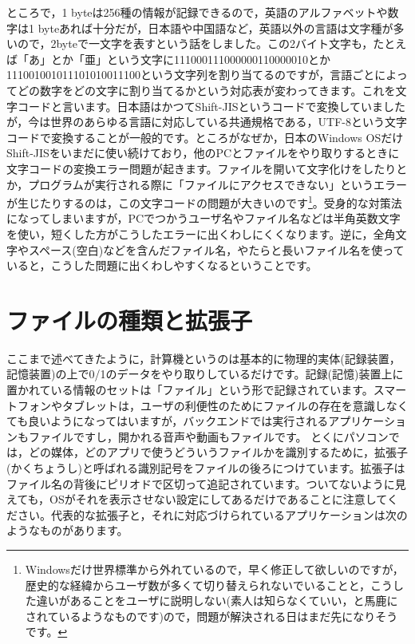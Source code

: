 \documentclass{ltjsbook}
\begin{document}
ところで，1 byteは256種の情報が記録できるので，英語のアルファベットや数字は1 byteあれば十分だが，日本語や中国語など，英語以外の言語は文字種が多いので，2byteで一文字を表すという話をしました。この2バイト文字も，たとえば「あ」とか「亜」という文字に111000111000000110000010とか111001001011101010011100という文字列を割り当てるのですが，言語ごとによってどの数字をどの文字に割り当てるかという対応表が変わってきます。これを文字コードと言います。日本語はかつてShift-JISというコードで変換していましたが，今は世界のあらゆる言語に対応している共通規格である，UTF-8という文字コードで変換することが一般的です。ところがなぜか，日本のWindows OSだけShift-JISをいまだに使い続けており，他のPCとファイルをやり取りするときに文字コードの変換エラー問題が起きます。ファイルを開いて文字化けをしたりとか，プログラムが実行される際に「ファイルにアクセスできない」というエラーが生じたりするのは，この文字コードの問題が大きいのです\footnote{Windowsだけ世界標準から外れているので，早く修正して欲しいのですが，歴史的な経緯からユーザ数が多くて切り替えられないでいることと，こうした違いがあることをユーザに説明しない(素人は知らなくていい，と馬鹿にされているようなものです)ので，問題が解決される日はまだ先になりそうです。}。受身的な対策法になってしまいますが，PCでつかうユーザ名やファイル名などは半角英数文字を使い，短くした方がこうしたエラーに出くわしにくくなります。逆に，全角文字やスペース(空白)などを含んだファイル名，やたらと長いファイル名を使っていると，こうした問題に出くわしやすくなるということです。


\section{ファイルの種類と拡張子}
\label{suffix}
ここまで述べてきたように，計算機というのは基本的に物理的実体(記録装置，記憶装置)の上で0/1のデータをやり取りしているだけです。記録(記憶)装置上に置かれている情報のセットは「ファイル」という形で記録されています。スマートフォンやタブレットは，ユーザの利便性のためにファイルの存在を意識しなくても良いようになってはいますが，バックエンドでは実行されるアプリケーションもファイルですし，開かれる音声や動画もファイルです。
とくにパソコンでは，どの媒体，どのアプリで使うどういうファイルかを識別するために，拡張子(かくちょうし)と呼ばれる識別記号をファイルの後ろにつけています。拡張子はファイル名の背後にピリオドで区切って追記されています。ついてないように見えても，OSがそれを表示させない設定にしてあるだけであることに注意してください。代表的な拡張子と，それに対応づけられているアプリケーションは次のようなものがあります。
\end{document}

